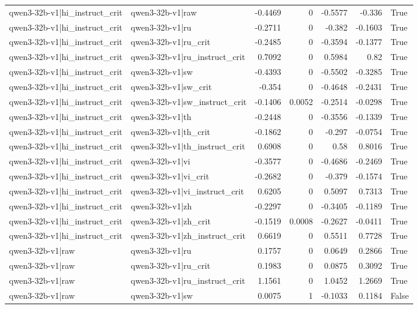 \begin{table}
\begin{tabular}{l l r r r r l}
qwen3-32b-v1|hi_instruct_crit & qwen3-32b-v1|raw & -0.4469 & 0 & -0.5577 & -0.336 & True \\
qwen3-32b-v1|hi_instruct_crit & qwen3-32b-v1|ru & -0.2711 & 0 & -0.382 & -0.1603 & True \\
qwen3-32b-v1|hi_instruct_crit & qwen3-32b-v1|ru_crit & -0.2485 & 0 & -0.3594 & -0.1377 & True \\
qwen3-32b-v1|hi_instruct_crit & qwen3-32b-v1|ru_instruct_crit & 0.7092 & 0 & 0.5984 & 0.82 & True \\
qwen3-32b-v1|hi_instruct_crit & qwen3-32b-v1|sw & -0.4393 & 0 & -0.5502 & -0.3285 & True \\
qwen3-32b-v1|hi_instruct_crit & qwen3-32b-v1|sw_crit & -0.354 & 0 & -0.4648 & -0.2431 & True \\
qwen3-32b-v1|hi_instruct_crit & qwen3-32b-v1|sw_instruct_crit & -0.1406 & 0.0052 & -0.2514 & -0.0298 & True \\
qwen3-32b-v1|hi_instruct_crit & qwen3-32b-v1|th & -0.2448 & 0 & -0.3556 & -0.1339 & True \\
qwen3-32b-v1|hi_instruct_crit & qwen3-32b-v1|th_crit & -0.1862 & 0 & -0.297 & -0.0754 & True \\
qwen3-32b-v1|hi_instruct_crit & qwen3-32b-v1|th_instruct_crit & 0.6908 & 0 & 0.58 & 0.8016 & True \\
qwen3-32b-v1|hi_instruct_crit & qwen3-32b-v1|vi & -0.3577 & 0 & -0.4686 & -0.2469 & True \\
qwen3-32b-v1|hi_instruct_crit & qwen3-32b-v1|vi_crit & -0.2682 & 0 & -0.379 & -0.1574 & True \\
qwen3-32b-v1|hi_instruct_crit & qwen3-32b-v1|vi_instruct_crit & 0.6205 & 0 & 0.5097 & 0.7313 & True \\
qwen3-32b-v1|hi_instruct_crit & qwen3-32b-v1|zh & -0.2297 & 0 & -0.3405 & -0.1189 & True \\
qwen3-32b-v1|hi_instruct_crit & qwen3-32b-v1|zh_crit & -0.1519 & 0.0008 & -0.2627 & -0.0411 & True \\
qwen3-32b-v1|hi_instruct_crit & qwen3-32b-v1|zh_instruct_crit & 0.6619 & 0 & 0.5511 & 0.7728 & True \\
qwen3-32b-v1|raw & qwen3-32b-v1|ru & 0.1757 & 0 & 0.0649 & 0.2866 & True \\
qwen3-32b-v1|raw & qwen3-32b-v1|ru_crit & 0.1983 & 0 & 0.0875 & 0.3092 & True \\
qwen3-32b-v1|raw & qwen3-32b-v1|ru_instruct_crit & 1.1561 & 0 & 1.0452 & 1.2669 & True \\
qwen3-32b-v1|raw & qwen3-32b-v1|sw & 0.0075 & 1 & -0.1033 & 0.1184 & False \\

\end{tabular}
\end{table}
